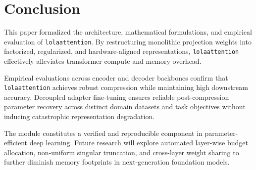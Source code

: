 \section{Conclusion}
This paper formalized the architecture, mathematical formulations, and empirical evaluation of \texttt{lolaattention}. By restructuring monolithic projection weights into factorized, regularized, and hardware-aligned representations, \texttt{lolaattention} effectively alleviates transformer compute and memory overhead.

Empirical evaluations across encoder and decoder backbones confirm that \texttt{lolaattention} achieves robust compression while maintaining high downstream accuracy. Decoupled adapter fine-tuning ensures reliable post-compression parameter recovery across distinct domain datasets and task objectives without inducing catastrophic representation degradation.

The module constitutes a verified and reproducible component in parameter-efficient deep learning. Future research will explore automated layer-wise budget allocation, non-uniform singular truncation, and cross-layer weight sharing to further diminish memory footprints in next-generation foundation models.
